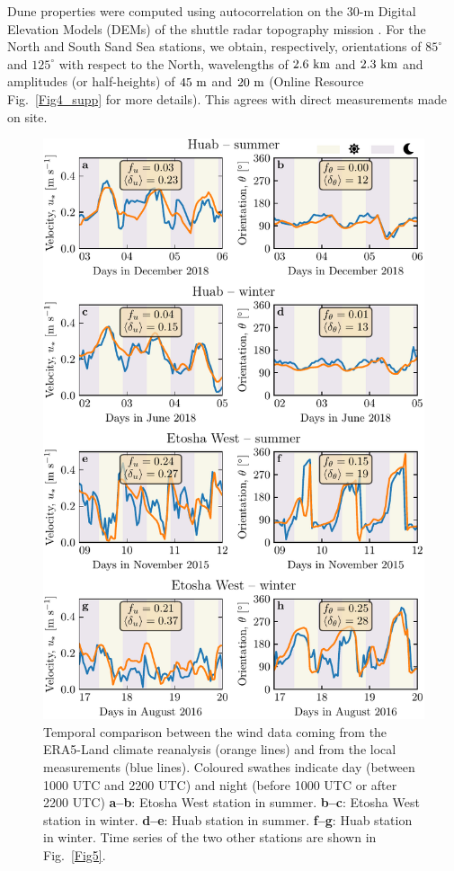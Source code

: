 Dune properties were computed using autocorrelation on the 30-m Digital Elevation Models (DEMs) of the shuttle radar topography mission \citep{Farr2007}. For the North and South Sand Sea stations, we obtain, respectively, orientations of $85^\circ$ and $125^\circ$ with respect to the North, wavelengths of $2.6~\textup{km}$ and $2.3~\textup{km}$ and amplitudes (or half-heights) of $45~\textup{m}$ and $20~\textup{m}$ (Online Resource Fig.~\ref{Fig4_supp} for more details). This agrees with direct measurements made on site.


\begin{figure}
\centering
\includegraphics[scale=1]{Figures/Figure3.pdf}
\caption{Temporal comparison between the wind data coming from the ERA5-Land climate reanalysis (orange lines) and from the local measurements (blue lines). Coloured swathes indicate day (between 1000 UTC and 2200 UTC) and night (before 1000 UTC or after 2200 UTC) \textbf{a--b}: Etosha West station in summer. \textbf{b--c}: Etosha West station in winter. \textbf{d--e}: Huab station in summer. \textbf{f--g}: Huab station in winter. Time series of the two other stations are shown in Fig.~\ref{Fig5}.}
\label{Fig3}
\end{figure}

